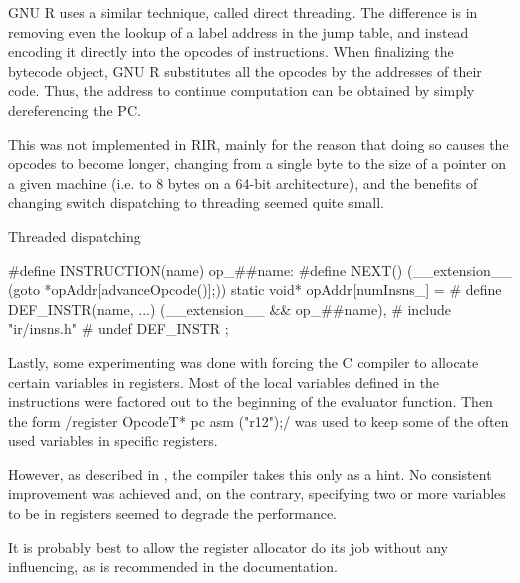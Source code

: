 GNU R uses a similar technique, called direct threading. The difference is in removing even the lookup of a label address in the jump table, and instead encoding it directly into the opcodes of instructions. When finalizing the bytecode object, GNU R substitutes all the opcodes by the addresses of their code. Thus, the address to continue computation can be obtained by simply dereferencing the PC.

This was not implemented in RIR, mainly for the reason that doing so causes the opcodes to become longer, changing from a single byte to the size of a pointer on a given machine (i.e. to 8 bytes on a 64-bit architecture), and the benefits of changing switch dispatching to threading seemed quite small.

\begin{listing}[htbp]
  \caption{\label{lst:threaded}Threaded dispatching}
  \begin{ccode}
#define INSTRUCTION(name) op_##name:
#define NEXT() (__extension__ ({goto *opAddr[advanceOpcode()];}))
static void* opAddr[numInsns_] = {
#    define DEF_INSTR(name, ...) (__extension__ && op_##name),
#    include "ir/insns.h"
#    undef DEF_INSTR
};
  \end{ccode}
\end{listing}

Lastly, some experimenting was done with forcing the C compiler to allocate certain variables in registers. Most of the local variables defined in the instructions were factored out to the beginning of the evaluator function. Then the form \cinline/register OpcodeT* pc asm ("r12");/ was used to keep some of the often used variables in specific registers.

However, as described in \autocite{gcc-register}, the compiler takes this only as a hint. No consistent improvement was achieved and, on the contrary, specifying two or more variables to be in registers seemed to degrade the performance.

It is probably best to allow the register allocator do its job without any influencing, as is recommended in the documentation.
